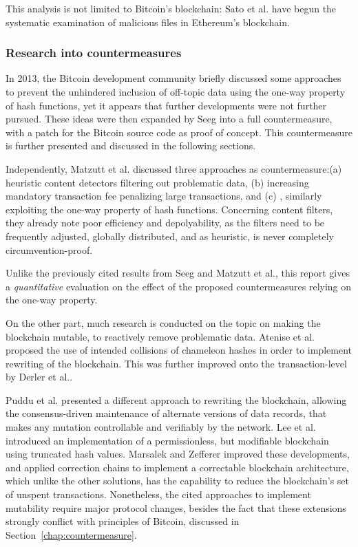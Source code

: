\documentclass[a4paper,11pt,titlepage]{scrbook}
\begin{document}
This analysis is not limited to Bitcoin's blockchain:\@
Sato et al.\@ \cite{sato_threat_2020} have begun the systematic examination of malicious files in Ethereum's blockchain.


\subsubsection*{Research into countermeasures}

In 2013, the Bitcoin development community briefly discussed some approaches to prevent the unhindered inclusion of off-topic data \cite{maxwell_prevent_2013} using the one-way property of hash functions, yet it appears that further developments were not further pursued.
These ideas were then expanded by Seeg \cite{seeg_hardening_2018} into a full countermeasure, with a patch for the Bitcoin source code as proof of concept.
This countermeasure is further presented and discussed in the following sections.

Independently, Matzutt et al.\@ \cite{matzutt_thwarting_2018} discussed three approaches as countermeasure:\@ (a) heuristic content detectors filtering out problematic data, (b) increasing mandatory transaction fee penalizing large transactions, and (c) , similarly exploiting the one-way property of hash functions.
Concerning content filters, they already note poor efficiency and depolyability, as the filters need to be frequently adjusted, globally distributed, and as heuristic, is never completely circumvention-proof.

Unlike the previously cited results from Seeg and Matzutt et al., this report gives a \emph{quantitative} evaluation on the effect of the proposed countermeasures relying on the one-way property.

On the other part, much research is conducted on the topic on making the blockchain mutable, to reactively remove problematic data.
Atenise et al.\@ \cite{ateniese_redactable_2017} proposed the use of intended collisions of chameleon hashes in order to implement rewriting of the blockchain.
This was further improved onto the transaction-level by Derler et al.\@ \cite{derler_fine-grained_2019}.

Puddu et al.\@ \cite{puddu_chain:_2017} presented a different approach to rewriting the blockchain, allowing the consensus-driven maintenance of alternate versions of data records, that makes any mutation controllable and verifiably by the network.
Lee et al.\@ \cite{lee_modifiable_2019} introduced an implementation of a permissionless, but modifiable blockchain using truncated hash values.
Marsalek and Zefferer \cite{marsalek_correctable_2019} improved these developments, and applied correction chains to implement a correctable blockchain architecture, which unlike the other solutions, has the capability to reduce the blockchain's set of unspent transactions.
Nonetheless, the cited approaches to implement mutability require major protocol changes, besides the fact that these extensions strongly conflict with principles of Bitcoin, discussed in Section~\ref{chap:countermeasure}.
\end{document}
